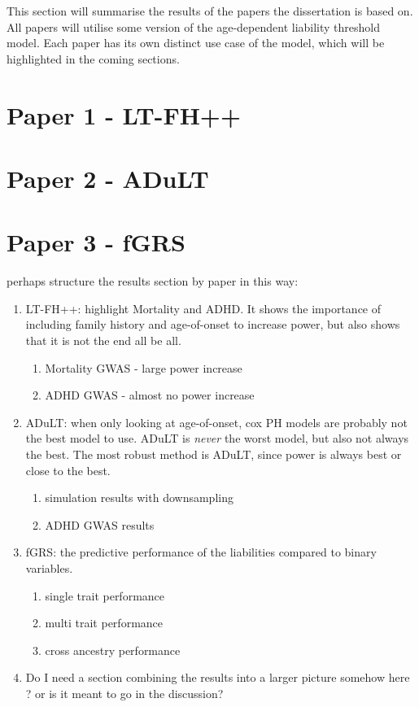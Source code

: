 


This section will summarise the results of the papers the dissertation is based on. All papers will utilise some version of the age-dependent liability threshold model. Each paper has its own distinct use case of the model, which will be highlighted in the coming sections.

\section{Paper 1 - LT-FH++}

\newpage

\section{Paper 2 - ADuLT}

\newpage

\section{Paper 3 - fGRS}

\newpage



perhaps structure the results section by paper in this way:

\begin{enumerate}
	\item LT-FH++: highlight Mortality and ADHD. It shows the importance of including family history and age-of-onset to increase power, but also shows that it is not the end all be all.
	\begin{enumerate}
		\item Mortality GWAS - large power increase
		\item ADHD GWAS - almost no power increase
	\end{enumerate}
	\item ADuLT: when only looking at age-of-onset, cox PH models are probably not the best model to use. ADuLT is \textit{never} the worst model, but also not always the best. The most robust method is ADuLT, since power is always best or close to the best.
	\begin{enumerate}
		\item simulation results with downsampling
		\item ADHD GWAS results
	\end{enumerate}
	\item fGRS: the predictive performance of the liabilities compared to binary variables.
	\begin{enumerate}
		\item single trait performance
		\item multi trait performance 
		\item cross ancestry performance
	\end{enumerate}	
	\item Do I need a section combining the results into a larger picture somehow here ? or is it meant to go in the discussion?
\end{enumerate}
